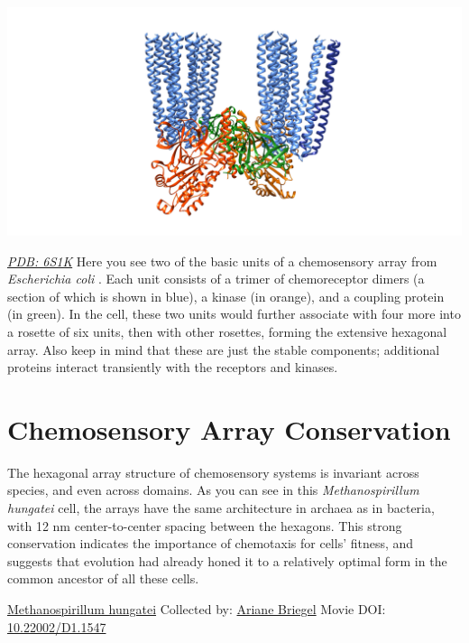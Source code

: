 \documentclass[]{tufte-book}
\begin{document}
\includegraphics{img/schematics/7_2_1}

\href{http://rcsb.org/structure/6S1K}{\emph{PDB: 6S1K}}
Here you see two of the basic units of a chemosensory array from \emph{Escherichia coli} \citep{cassidy2020}. Each unit consists of a trimer of chemoreceptor dimers (a section of which is shown in blue), a kinase (in orange), and a coupling protein (in green). In the cell, these two units would further associate with four more into a rosette of six units, then with other rosettes, forming the extensive hexagonal array. Also keep in mind that these are just the stable components; additional proteins interact transiently with the receptors and kinases.

\hypertarget{chemosensory-array-conservation}{%
\section{Chemosensory Array Conservation}\label{chemosensory-array-conservation}}

The hexagonal array structure of chemosensory systems is invariant across species, and even across domains. As you can see in this \emph{Methanospirillum hungatei} cell, the arrays have the same architecture in archaea as in bacteria, with 12 nm center-to-center spacing between the hexagons. This strong conservation indicates the importance of chemotaxis for cells' fitness, and suggests that evolution had already honed it to a relatively optimal form in the common ancestor of all these cells.



\hypertarget{htmlwidget-e66999914be099f6a553}{}

\label{fig:7-3}\protect\hyperlink{tree}{Methanospirillum hungatei} Collected by: \protect\hyperlink{ariane_briegel}{Ariane Briegel} Movie DOI: \href{https://doi.org/10.22002/D1.1547}{10.22002/D1.1547}
\end{document}
